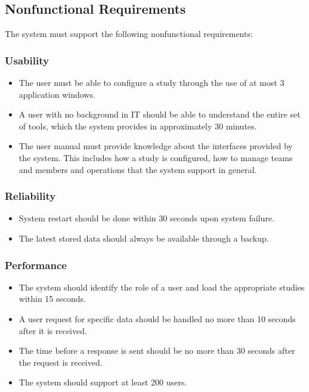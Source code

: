 \newpage

\subsection{Nonfunctional Requirements}
The system must support the following nonfunctional requirements:

\subsubsection{Usability}

\begin{itemize}
	\item The user must be able to configure a study through the use of at most 3 application windows.
	\item A user with no background in IT should be able to understand the entire set of tools, which the system provides in approximately 30 minutes. 
	\item The user manual must provide knowledge about the interfaces provided by the system. This includes how a study is configured, how to manage teams and members and operations that the system support in general. 
\end{itemize}

\subsubsection{Reliability}

\begin{itemize}
	\item System restart should be done within 30 seconds upon system failure.
	\item The latest stored data should always be available through a backup.
\end{itemize}

\subsubsection{Performance}

\begin{itemize}
	\item The system should identify the role of a user and load the appropriate studies within 15 seconds.
	\item A user request for specific data should be handled no more than 10 seconds after it is received.
	\item The time before a response is sent should be no more than 30 seconds after the request is received.
	\item The system should support at least 200 users.
\end{itemize}

